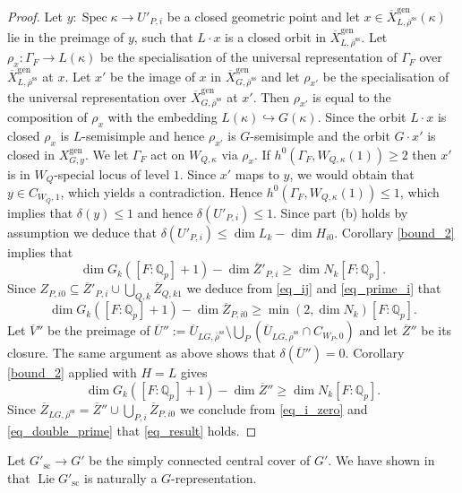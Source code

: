 \documentclass{amsart}
\theoremstyle{definition}
\theoremstyle{remark}
\DeclareMathOperator{\Spec}{Spec}
\newcommand{\Qp}{\mathbb {Q}_p}
\newcommand{\Zbar}{\overline{Z}}
\newcommand{\Vbar}{\overline{{V}}}
\newcommand{\rhobar}{\overline{\rho}}
\newcommand{\gen}{\mathrm{gen}}
\newcommand{\Xbar}{\overline{X}}
\DeclareMathOperator{\Lie}{Lie}
\newcommand{\rhobarss}{\rhobar^{\mathrm{ss}}}
\newcommand{\Ubar}{\overline{U}}
\newcommand{\sic}{\operatorname{sc}}
\begin{document}
\begin{proof}
 Let $y: \Spec \kappa\rightarrow U'_{P,i}$ be a closed geometric point  and let $x\in \Xbar^{\gen}_{L, \rhobarss}(\kappa)$ lie in the preimage of $y$, such that $L\cdot x$ is a closed orbit in $\Xbar^{\gen}_{L, \rhobarss}$. Let $\rho_x: \Gamma_F \rightarrow L(\kappa)$ be the 
 specialisation of the universal representation of $\Gamma_F$ over $\Xbar^{\gen}_{L, \rhobarss}$
 at $x$. Let $x'$ be the image of $x$ in $\Xbar^{\gen}_{G, \rhobarss}$ and let $\rho_{x'}$ 
 be the specialisation of the universal representation over $\Xbar^{\gen}_{G, \rhobarss}$
 at $x'$. Then $\rho_{x'}$ is equal to the composition of $\rho_x$ with the embedding
 $L(\kappa)\hookrightarrow G(\kappa)$. Since the orbit $L\cdot x$ is closed $\rho_x$ is 
 $L$-semisimple and hence $\rho_{x'}$ is $G$-semisimple and the orbit $G\cdot x'$ is 
 closed in $X^{\gen}_{G,y}$. We let $\Gamma_F$ act on $W_{Q, \kappa}$ via $\rho_x$. 
 If $h^0(\Gamma_F, W_{Q, \kappa}(1))\ge 2$ then $x'$ is in $W_{Q}$-special locus of level $1$. 
 Since $x'$ maps to $y$, we would obtain that $y\in C_{W_Q, 1}$, which yields a contradiction. 
 Hence $h^0(\Gamma_F, W_{Q, \kappa}(1))\le 1$, which implies that $\delta(y)\le 1$ and 
hence $\delta(U'_{P,i})\le 1$. Since  part (b) holds by assumption we deduce 
that $\delta(U'_{P,i})\le \dim L_k -\dim H_{i0}$. Corollary \ref{bound_2} implies that 
\begin{equation}\label{eq_prime_i}
\dim G_k([F:\Qp] +1) - \dim \Zbar'_{P,i} \ge \dim N_k [F:\Qp].
\end{equation}
Since $Z_{P, i0} \subseteq \Zbar'_{P,i} \cup \bigcup_{Q,k} \Zbar_{Q,k1}$ we deduce from \eqref{eq_ij} and \eqref{eq_prime_i} that 
\begin{equation}\label{eq_i_zero}
\dim G_k([F:\Qp] +1) - \dim \Zbar_{P,i0} \ge \min(2, \dim N_k)[F:\Qp].
\end{equation}
Let $\Vbar''$ be the preimage of $\Ubar'':= \Ubar_{LG, \rhobarss} \setminus \bigcup_P (\Ubar_{LG, \rhobarss}\cap C_{W_P,0})$ 
and let $\Zbar''$ be its closure. The same argument as above shows that $\delta(\Ubar'')=0$. Corollary 
\ref{bound_2} applied with $H=L$ gives
\begin{equation}\label{eq_double_prime} 
\dim G_k([F:\Qp] +1) - \dim \Zbar'' \ge \dim N_k [F:\Qp].
\end{equation}
Since $\Zbar_{LG, \rhobarss} = \Zbar''\cup \bigcup_{P,i} \Zbar_{P,i0}$ we conclude from \eqref{eq_i_zero} and
\eqref{eq_double_prime} that \eqref{eq_result} holds. 
\end{proof}

Let $G'_{\sic}\rightarrow G'$ be the simply connected central cover of $G'$. We have 
shown in  that $\Lie G'_{\sic}$ is naturally a $G$-representation.
\end{document}
